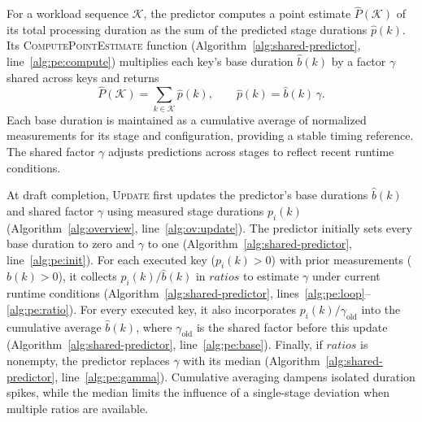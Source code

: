 For a workload sequence \(\mathcal K\), the predictor computes a point estimate \(\hat P(\mathcal K)\) of its total processing duration as the sum of the predicted stage durations \(\hat p(k)\).
Its \textsc{ComputePointEstimate} function (Algorithm~\ref{alg:shared-predictor}, line~\ref{alg:pe:compute}) multiplies each key's base duration \(\hat b(k)\) by a factor \(\gamma\) shared across keys and returns
\begin{equation*}
  \hat P(\mathcal{K})
  =\sum_{k\in\mathcal{K}}\hat p(k),
  \qquad
  \hat p(k)=\hat b(k)\,\gamma .
\end{equation*}
Each base duration is maintained as a cumulative average of normalized measurements for its stage and configuration, providing a stable timing reference.
The shared factor \(\gamma\) adjusts predictions across stages to reflect recent runtime conditions.

At draft completion, \textsc{Update} first updates the predictor's base durations \(\hat b(k)\) and shared factor \(\gamma\) using measured stage durations \(p_i(k)\) (Algorithm~\ref{alg:overview}, line~\ref{alg:ov:update}).
The predictor initially sets every base duration to zero and \(\gamma\) to one (Algorithm~\ref{alg:shared-predictor}, line~\ref{alg:pe:init}).
For each executed key (\(p_i(k)>0\)) with prior measurements (\(\hat b(k)>0\)), it collects \(p_i(k)/\hat b(k)\) in \(\mathit{ratios}\) to estimate \(\gamma\) under current runtime conditions (Algorithm~\ref{alg:shared-predictor}, lines~\ref{alg:pe:loop}--\ref{alg:pe:ratio}).
For every executed key, it also incorporates \(p_i(k)/\gamma_{\mathrm{old}}\) into the cumulative average \(\hat b(k)\), where \(\gamma_{\mathrm{old}}\) is the shared factor before this update (Algorithm~\ref{alg:shared-predictor}, line~\ref{alg:pe:base}).
Finally, if \(\mathit{ratios}\) is nonempty, the predictor replaces \(\gamma\) with its median (Algorithm~\ref{alg:shared-predictor}, line~\ref{alg:pe:gamma}).
Cumulative averaging dampens isolated duration spikes, while the median limits the influence of a single-stage deviation when multiple ratios are available.




